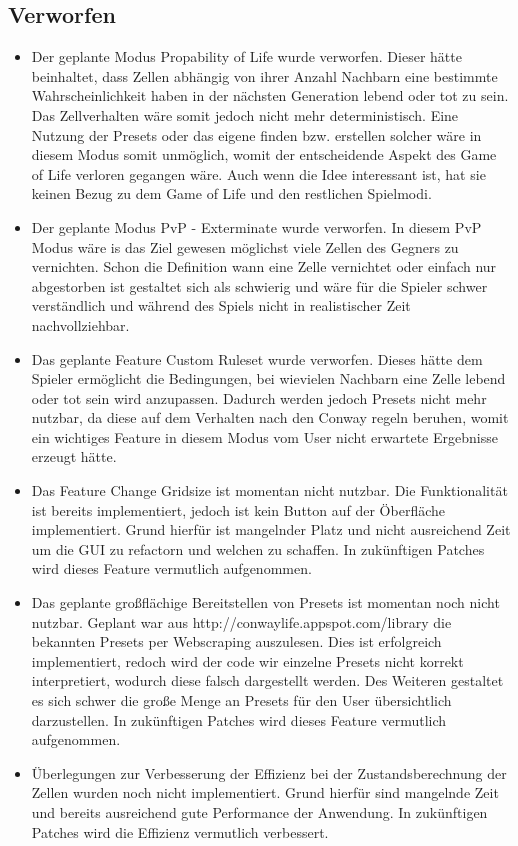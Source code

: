 \documentclass[12pt]{article}
\theoremstyle{plain}
\begin{document}
\begin{linenumbers}
\subsection{Verworfen}
\begin{itemize}
\item
Der geplante Modus Propability of Life wurde verworfen. Dieser hätte beinhaltet, dass Zellen abhängig von ihrer Anzahl Nachbarn eine bestimmte Wahrscheinlichkeit haben in der nächsten Generation lebend oder tot zu sein. Das Zellverhalten wäre somit jedoch nicht mehr deterministisch. Eine Nutzung der Presets oder das eigene finden bzw. erstellen solcher wäre in diesem Modus somit unmöglich, womit der entscheidende Aspekt des Game of Life verloren gegangen wäre. Auch wenn die Idee interessant ist, hat sie keinen Bezug zu dem Game of Life und den restlichen Spielmodi.
\item
Der geplante Modus PvP - Exterminate wurde verworfen. In diesem PvP Modus wäre is das Ziel gewesen möglichst viele Zellen des Gegners zu vernichten. Schon die Definition wann eine Zelle vernichtet oder einfach nur abgestorben ist gestaltet sich als schwierig und wäre für die Spieler schwer verständlich und während des Spiels nicht in realistischer Zeit nachvollziehbar.
\item
Das geplante Feature Custom Ruleset wurde verworfen. Dieses hätte dem Spieler ermöglicht die Bedingungen, bei wievielen Nachbarn eine Zelle lebend oder tot sein wird anzupassen. Dadurch werden jedoch Presets nicht mehr nutzbar, da diese auf dem Verhalten nach den Conway regeln beruhen, womit ein wichtiges Feature in diesem Modus vom User nicht erwartete Ergebnisse erzeugt hätte.
\item
Das Feature Change Gridsize ist momentan nicht nutzbar. Die Funktionalität ist bereits implementiert, jedoch ist kein Button auf der Öberfläche implementiert. Grund hierfür ist mangelnder Platz und nicht ausreichend Zeit um die GUI zu refactorn und welchen zu schaffen. In zukünftigen Patches wird dieses Feature vermutlich aufgenommen.
\item
Das geplante großflächige Bereitstellen von Presets ist momentan noch nicht nutzbar. Geplant war aus http://conwaylife.appspot.com/library die bekannten Presets per Webscraping auszulesen. Dies ist erfolgreich implementiert, redoch wird der code wir einzelne Presets nicht korrekt interpretiert, wodurch diese falsch dargestellt werden.  Des Weiteren gestaltet es sich schwer die große Menge an Presets für den User übersichtlich darzustellen. In zukünftigen Patches wird dieses Feature vermutlich aufgenommen.
\item
Überlegungen zur Verbesserung der Effizienz bei der Zustandsberechnung der Zellen wurden noch nicht implementiert. Grund hierfür sind mangelnde Zeit und bereits ausreichend gute Performance der Anwendung. In zukünftigen Patches wird die Effizienz vermutlich verbessert.
\end{itemize}


\end{linenumbers}
\end{document}
